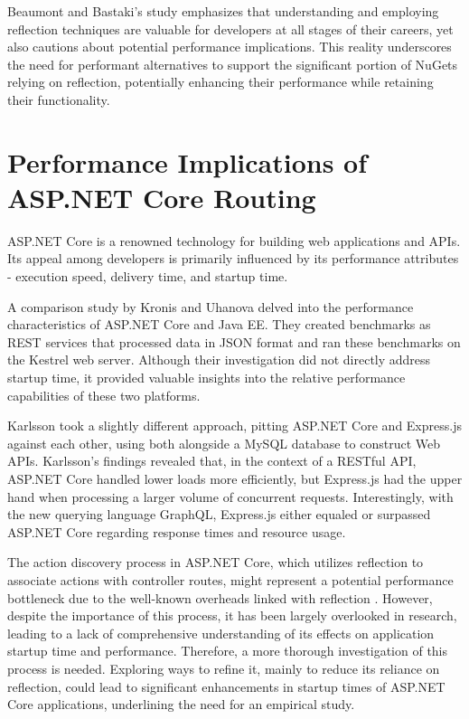 Beaumont and Bastaki's study \cite{Beaumont2022} emphasizes that understanding and employing reflection techniques are valuable for developers at all stages of their careers, yet also cautions about potential performance implications. This reality underscores the need for performant alternatives to support the significant portion of NuGets relying on reflection, potentially enhancing their performance while retaining their functionality.

\section{Performance Implications of ASP.NET Core Routing}

ASP.NET Core is a renowned technology for building web applications and APIs. Its appeal among developers is primarily influenced by its performance attributes - execution speed, delivery time, and startup time.

A comparison study by Kronis and Uhanova \cite{Kronis2018} delved into the performance characteristics of ASP.NET Core and Java EE. They created benchmarks as REST services that processed data in JSON format and ran these benchmarks on the Kestrel web server. Although their investigation did not directly address startup time, it provided valuable insights into the relative performance capabilities of these two platforms.

Karlsson \cite{Karlsson2021} took a slightly different approach, pitting ASP.NET Core and Express.js against each other, using both alongside a MySQL database to construct Web APIs. Karlsson's findings revealed that, in the context of a RESTful API, ASP.NET Core handled lower loads more efficiently, but Express.js had the upper hand when processing a larger volume of concurrent requests. Interestingly, with the new querying language GraphQL, Express.js either equaled or surpassed ASP.NET Core regarding response times and resource usage.

The action discovery process in ASP.NET Core, which utilizes reflection to associate actions with controller routes, might represent a potential performance bottleneck due to the well-known overheads linked with reflection \cite{Beaumont2022}. However, despite the importance of this process, it has been largely overlooked in research, leading to a lack of comprehensive understanding of its effects on application startup time and performance. Therefore, a more thorough investigation of this process is needed. Exploring ways to refine it, mainly to reduce its reliance on reflection, could lead to significant enhancements in startup times of ASP.NET Core applications, underlining the need for an empirical study.

